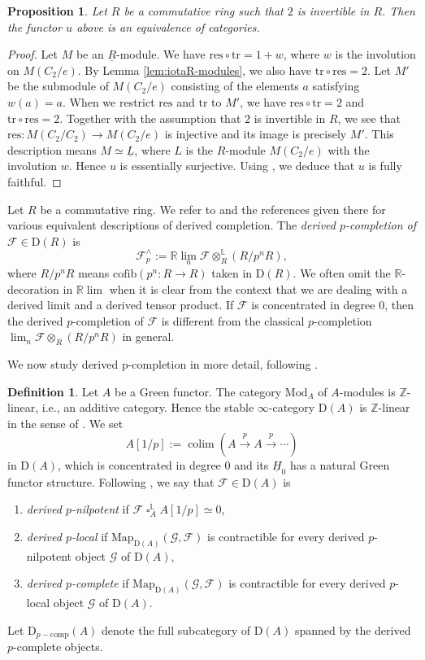 \documentclass[10pt]{amsart}
\newtheorem{prop}[thm]{Proposition}
\theoremstyle{definition}
\newtheorem{df}[thm]{Definition}
\numberwithin{equation}{section}
\renewcommand{\L}{\mathbb{L}}
\newcommand{\R}{\mathbb{R}}
\newcommand{\Z}{\mathbb{Z}}
\newcommand{\cF}{\mathcal{F}}
\newcommand{\cG}{\mathcal{G}}
\newcommand{\rD}{\mathrm{D}}
\newcommand{\ul}{\underline}
\newcommand{\Mod}{\mathrm{Mod}}
\newcommand{\Map}{\mathrm{Map}}
\newcommand{\cofib}{\mathrm{cofib}}
\newcommand{\comp}{\mathrm{comp}}
\newcommand{\colim}{\mathop{\mathrm{colim}}}
\DeclareMathOperator{\sotimes}{\square}
\newcommand{\tr}{\mathrm{tr}}
\newcommand{\res}{\mathrm{res}}
\begin{document}
\begin{prop}
\label{inverting 2}
Let $R$ be a commutative ring such that $2$ is invertible in $R$.
Then the functor $u$ above is an equivalence of categories.
\end{prop}
\begin{proof}
Let $M$ be an $\ul{R}$-module.
We have $\res\circ \tr=1+w$,
where $w$ is the involution on $M(C_2/e)$.
By Lemma \ref{lem:iotaR-modules},
we also have $\tr\circ\res=2$.
Let $M'$ be the submodule of $M(C_2/e)$ consisting of the elements $a$ satisfying $w(a)=a$.
When we restrict $\res$ and $\tr$ to $M'$,
we have $\res\circ\tr=2$ and $\tr\circ \res=2$.
Together with the assumption that $2$ is invertible in $R$,
we see that $\res\colon M(C_2/C_2)\to M(C_2/e)$ is injective and its image is precisely $M'$.
This description means $M\simeq\ul{L}$, where $L$ is the $R$-module $M(C_2/e)$ with the involution $w$.
Hence $u$ is essentially surjective.
Using \cite[Lemma 2.2.3]{HP23},
we deduce that $u$ is fully faithful.
\end{proof}

Let $R$ be a commutative ring.
We refer to \cite[\href{https://stacks.math.columbia.edu/tag/091N}{Tag 091N}]{stacks} and the references given there for various equivalent descriptions of derived completion.
The \emph{derived $p$-completion of $\cF\in \rD(R)$} is
\[
\cF_p^\wedge:=\R\lim_n \cF\otimes_{R}^\L (R/p^nR),
\]
where $R/p^n R$ means $\cofib(p^n\colon R\to R)$ taken in $\rD(R)$.
We often omit the $\R$-decoration in $\R\lim$ when it is clear from the context that we are dealing with a derived limit and a derived tensor product.
If $\cF$ is concentrated in degree $0$,
then the derived $p$-completion of $\cF$ is different from the classical $p$-completion $\lim_n \cF\otimes_R (R/p^n R)$ in general.

We now study derived p-completion in more detail, following \cite{SAG}.

\begin{df}\label{def:completion}
Let $A$ be a Green functor.
The category $\Mod_{A}$ of $A$-modules is $\Z$-linear, i.e., an additive category.
Hence the stable $\infty$-category $\rD(A)$ is $\Z$-linear in the sense of \cite[Definition D.1.2.1]{SAG}.
We set
\[
A[1/p]
:=
\colim(A\xrightarrow{p} A\xrightarrow{p}\cdots)
\]
in $\rD(A)$,
which is concentrated in degree $0$ and its $\ul{H}_0$ has a natural Green functor structure.
Following \cite[Definitions 7.1.1.1, 7.2.4.1, 7.3.1.1]{SAG},
we say that $\cF\in \rD(A)$ is
\begin{enumerate}
\item[(1)] \emph{derived $p$-nilpotent} if $\cF\sotimes_{A}^\L A[1/p]\simeq 0$,
\item[(2)] \emph{derived $p$-local} if $\Map_{\rD(A)}(\cG,\cF)$ is contractible for every derived $p$-nilpotent object $\cG$ of $\rD(A)$,
\item[(3)] \emph{derived $p$-complete} if $\Map_{\rD(A)}(\cG,\cF)$ is contractible for every derived $p$-local object $\cG$ of $\rD(A)$.
\end{enumerate}
Let $\rD_{p-\comp}(A)$ denote the full subcategory of $\rD(A)$ spanned by the derived $p$-complete objects.
\end{df}
\end{document}
